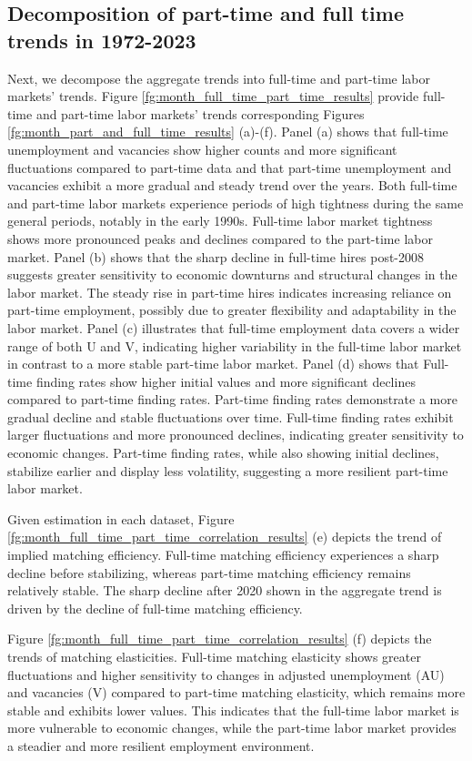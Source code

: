 \documentclass[12pt]{article}
\begin{document}
\subsection{Decomposition of part-time and full time trends in 1972-2023}
Next, we decompose the aggregate trends into full-time and part-time labor markets' trends.
Figure \ref{fg:month_full_time_part_time_results} provide full-time and part-time labor markets' trends corresponding Figures \ref{fg:month_part_and_full_time_results} (a)-(f).
Panel (a) shows that full-time unemployment and vacancies show higher counts and more significant fluctuations compared to part-time data and that part-time unemployment and vacancies exhibit a more gradual and steady trend over the years.
Both full-time and part-time labor markets experience periods of high tightness during the same general periods, notably in the early 1990s.
Full-time labor market tightness shows more pronounced peaks and declines compared to the part-time labor market.
Panel (b) shows that the sharp decline in full-time hires post-2008 suggests greater sensitivity to economic downturns and structural changes in the labor market.
The steady rise in part-time hires indicates increasing reliance on part-time employment, possibly due to greater flexibility and adaptability in the labor market.
Panel (c) illustrates that full-time employment data covers a wider range of both U and V, indicating higher variability in the full-time labor market in contrast to a more stable part-time labor market.
Panel (d) shows that Full-time finding rates show higher initial values and more significant declines compared to part-time finding rates.
Part-time finding rates demonstrate a more gradual decline and stable fluctuations over time.
Full-time finding rates exhibit larger fluctuations and more pronounced declines, indicating greater sensitivity to economic changes.
Part-time finding rates, while also showing initial declines, stabilize earlier and display less volatility, suggesting a more resilient part-time labor market.

Given estimation in each dataset, Figure \ref{fg:month_full_time_part_time_correlation_results} (e) depicts the trend of implied matching efficiency.
Full-time matching efficiency experiences a sharp decline before stabilizing, whereas part-time matching efficiency remains relatively stable.
The sharp decline after 2020 shown in the aggregate trend is driven by the decline of full-time matching efficiency.

Figure \ref{fg:month_full_time_part_time_correlation_results} (f) depicts the trends of matching elasticities.
Full-time matching elasticity shows greater fluctuations and higher sensitivity to changes in adjusted unemployment (AU) and vacancies (V) compared to part-time matching elasticity, which remains more stable and exhibits lower values. This indicates that the full-time labor market is more vulnerable to economic changes, while the part-time labor market provides a steadier and more resilient employment environment.
\end{document}
